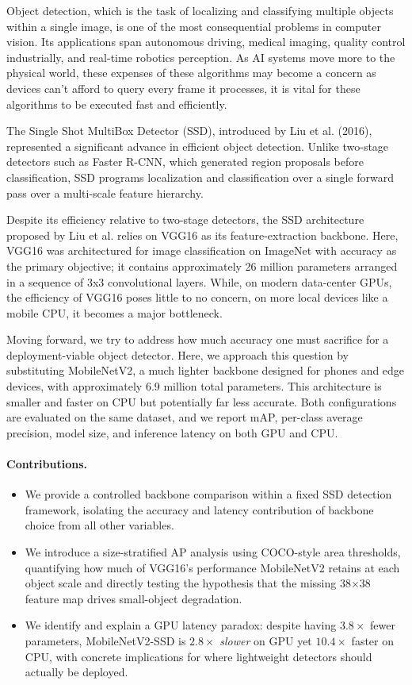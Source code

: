 \documentclass{article}
\begin{document}
\qquad Object detection, which is the task of localizing and classifying multiple objects within a single image, is one of the most consequential problems in computer vision. Its applications span autonomous driving, medical imaging, quality control industrially, and real-time robotics perception. As AI systems move more to the physical world, these expenses of these algorithms may become a concern as devices can't afford to query every frame it processes, it is vital for these algorithms to be executed fast and efficiently.

\qquad The Single Shot MultiBox Detector (SSD), introduced by Liu et al. (2016), represented a significant advance in efficient object detection. Unlike two-stage detectors such as Faster R-CNN, which generated region proposals before classification, SSD programs localization and classification over a single forward pass over a multi-scale feature hierarchy.

\qquad Despite its efficiency relative to two-stage detectors, the SSD architecture proposed by Liu et al. relies on VGG16 as its feature-extraction backbone. Here, VGG16 was architectured for image classification on ImageNet with accuracy as the primary objective; it contains approximately 26 million parameters arranged in a sequence of 3x3 convolutional layers. While, on modern data-center GPUs, the efficiency of VGG16 poses little to no concern, on more local devices like a mobile CPU, it becomes a major bottleneck.

\qquad Moving forward, we try to address how much accuracy one must sacrifice for a deployment-viable object detector. Here, we approach this question by substituting MobileNetV2, a much lighter backbone designed for phones and edge devices, with approximately 6.9 million total parameters. This architecture is smaller and faster on CPU but potentially far less accurate. Both configurations are evaluated on the same dataset, and we report mAP, per-class average precision, model size, and inference latency on both GPU and CPU.

\paragraph{Contributions.}
\begin{itemize}
  \item We provide a controlled backbone comparison within a fixed SSD detection framework, isolating the accuracy and latency contribution of backbone choice from all other variables.
  \item We introduce a size-stratified AP analysis using COCO-style area thresholds, quantifying how much of VGG16's performance MobileNetV2 retains at each object scale and directly testing the hypothesis that the missing 38$\times$38 feature map drives small-object degradation.
  \item We identify and explain a GPU latency paradox: despite having $3.8\times$ fewer parameters, MobileNetV2-SSD is $2.8\times$ \emph{slower} on GPU yet $10.4\times$ faster on CPU, with concrete implications for where lightweight detectors should actually be deployed.
\end{itemize}
\end{document}
